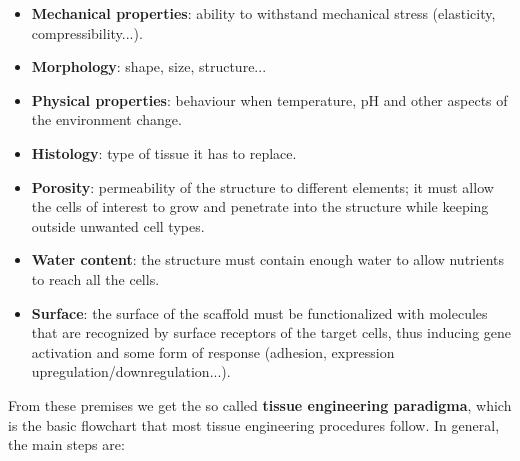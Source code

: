   \begin{multicols}{2}
    \begin{itemize}
      \item \textbf{Mechanical properties}: ability to withstand mechanical stress (elasticity, compressibility...).
      \item \textbf{Morphology}: shape, size, structure...
      \item \textbf{Physical properties}: behaviour when temperature, pH and other aspects of the environment change.
      \item \textbf{Histology}: type of tissue it has to replace.
      \item \textbf{Porosity}: permeability of the structure to different elements; it must allow the cells of interest to grow and penetrate into the structure while keeping outside unwanted cell types.
      \item \textbf{Water content}: the structure must contain enough water to allow nutrients to reach all the cells.
      \item \textbf{Surface}: the surface of the scaffold must be functionalized with molecules that are recognized by surface receptors of the target cells, thus inducing gene activation and some form of response (adhesion, expression upregulation/downregulation...).
    \end{itemize}
  \end{multicols}

  From these premises we get the so called \textbf{tissue engineering paradigma}, which is the basic flowchart that most tissue engineering procedures follow.
  In general, the main steps are:

